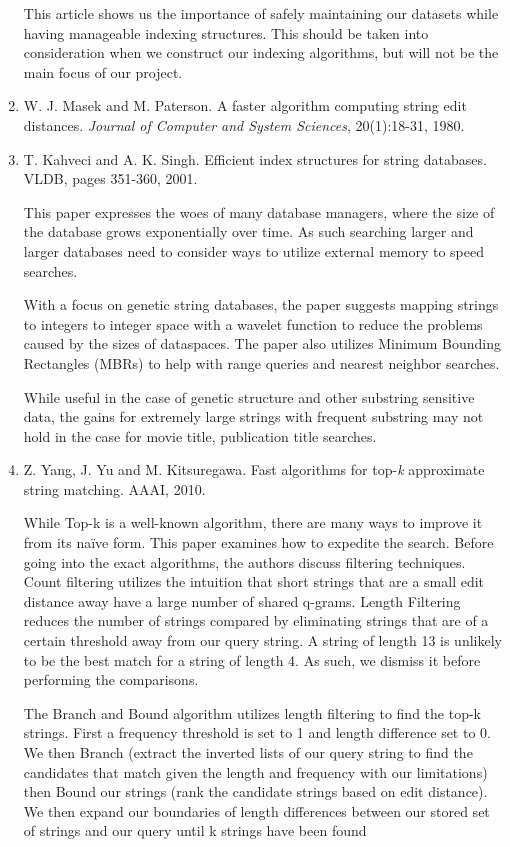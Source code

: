 \documentclass[pdftex,12pt,letter]{article}
\begin{document}
\begin{enumerate}
	This article shows us the importance of safely maintaining our datasets while having manageable indexing structures. This should be taken into consideration when we construct our indexing algorithms, but will not be the main focus of our project. 


\item W. J. Masek and M. Paterson. A faster algorithm computing string edit distances. \textit{Journal of Computer and System Sciences}, 20(1):18-31, 1980.
\item T. Kahveci and A. K. Singh. Efficient index structures for string databases. VLDB, pages 351-360, 2001.

	This paper expresses the woes of many database managers, where the size of the database grows exponentially over time. As such searching larger and larger databases need to consider ways to utilize external memory to speed searches. 

	With a focus on genetic string databases, the paper suggests mapping strings to integers to integer space with a wavelet function to reduce the problems caused by the sizes of dataspaces. The paper also utilizes Minimum Bounding Rectangles (MBRs) to help with range queries and nearest neighbor searches. 

	While useful in the case of genetic structure and other substring sensitive data, the gains for extremely large strings with frequent substring may not hold in the case for movie title, publication title searches. 


\item Z. Yang, J. Yu and M. Kitsuregawa. Fast algorithms for top-\textit{k} approximate string matching. AAAI, 2010.

	While Top-k is a well-known algorithm, there are many ways to improve it from its naïve form. This paper examines how to expedite the search. Before going into the exact algorithms, the authors discuss filtering techniques. Count filtering utilizes the intuition that short strings that are a small edit distance away have a large number of shared q-grams. Length Filtering reduces the number of strings compared by eliminating strings that are of a certain threshold away from our query string. A string of length 13 is unlikely to be the best match for a string of length 4. As such, we dismiss it before performing the comparisons. 

	The Branch and Bound algorithm utilizes length filtering to find the top-k strings. First a frequency threshold is set to 1 and length difference set to 0. We then Branch (extract the inverted lists of our query string to find the candidates that match given the length and frequency with our limitations) then Bound our strings (rank the candidate strings based on edit distance). We then expand our boundaries of length differences between our stored set of strings and our query until k strings have been found


\end{enumerate}
\end{document}
